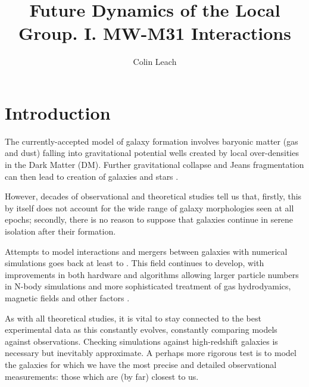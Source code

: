 \documentclass[twocolumn]{aastex63}
\newcommand{\todo}{\color{red}{TODO}\color{black}\hspace{2mm}}
\begin{document}
	
\title{Future Dynamics of the Local Group. I. MW-M31 Interactions}

\author[0000-0003-3608-1546]{Colin Leach}

\begin{abstract}
	
\todo{Add a concise and intelligent summary of the paper, once I get a clearer idea what it will include (and how to seem intelligent).}\vspace{5mm}

%
	
\end{abstract}




\section{Introduction}

The currently-accepted model of galaxy formation involves baryonic matter (gas and dust) falling into gravitational potential wells created by local over-densities in the Dark Matter (DM). Further gravitational collapse and Jeans fragmentation can then lead to creation of galaxies and stars \citep{mo_galaxy_2010}.

However, decades of observational and theoretical studies tell us that, firstly, this by itself does not account for the wide range of galaxy morphologies seen at all epochs; secondly, there is no reason to suppose that galaxies continue in serene isolation after their formation.

Attempts to model interactions and mergers between galaxies with numerical simulations goes back at least to \citet{toomre_galactic_1972}. This field continues to develop, with improvements in both hardware and algorithms allowing larger particle numbers in N-body simulations and more sophisticated treatment of gas hydrodyamics, magnetic fields and other factors \citep{bodenheimer_numerical_2007}.

As with all theoretical studies, it is vital to stay connected to the best experimental data as this constantly evolves, constantly comparing models against observations. Checking simulations against high-redshift galaxies is necessary but inevitably approximate. A perhaps more rigorous test is to model the galaxies for which we have the most precise and detailed observational measurements: those which are (by far) closest to us. 
\end{document}
